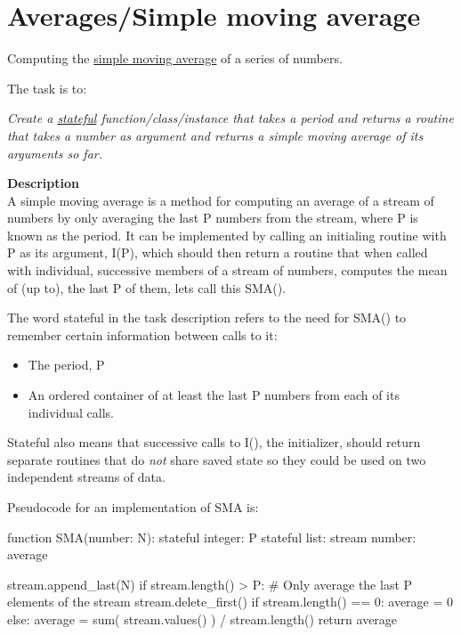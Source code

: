 \pagebreak{}
\section*{Averages/Simple moving average}


Computing the
\href{http://en.wikipedia.org/wiki/Moving\_average\#Simple\_moving\_average}{simple
moving average} of a series of numbers.

The task is to:

\emph{Create a \href{http://en.wikipedia.org/wiki/Stateful}{stateful}
function/class/instance that takes a period and returns a routine that
takes a number as argument and returns a simple moving average of its
arguments so far.}

\textbf{Description}\\ A simple moving average is a method for computing
an average of a stream of numbers by only averaging the last P numbers
from the stream, where P is known as the period. It can be implemented
by calling an initialing routine with P as its argument, I(P), which
should then return a routine that when called with individual,
successive members of a stream of numbers, computes the mean of (up to),
the last P of them, lets call this SMA().

The word stateful in the task description refers to the need for SMA()
to remember certain information between calls to it:

\begin{itemize}
\item
  The period, P
\item
  An ordered container of at least the last P numbers from each of its
  individual calls.
\end{itemize}

Stateful also means that successive calls to I(), the initializer,
should return separate routines that do \emph{not} share saved state so
they could be used on two independent streams of data.

Pseudocode for an implementation of SMA is:

\begin{wideverbatim}
function SMA(number: N):
    stateful integer: P
    stateful list:    stream
    number:           average

    stream.append_last(N)
    if stream.length() > P:
        # Only average the last P elements of the stream
        stream.delete_first()
    if stream.length() == 0:
        average = 0
    else:    
        average = sum( stream.values() ) / stream.length()
    return average
\end{wideverbatim}

